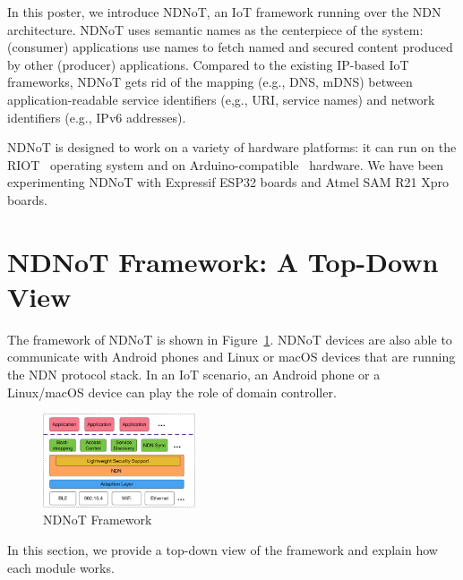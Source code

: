 \documentclass[sigconf]{acmart}
\begin{document}
In this poster, we introduce NDNoT, an IoT framework running over the NDN architecture.
NDNoT uses semantic names as the centerpiece of the system: (consumer) applications use names to fetch named and secured content produced by other (producer) applications.
Compared to the existing IP-based IoT frameworks, NDNoT gets rid of the mapping (e.g., DNS, mDNS) between application-readable service identifiers (e,g., URI, service names) and network identifiers (e.g., IPv6 addresses).

NDNoT is designed to work on a variety of hardware platforms: it can run on the RIOT~\cite{baccelli2018riot} operating system and on Arduino-compatible~\cite{Arduino} hardware.
We have been experimenting NDNoT with Expressif ESP32 boards and Atmel SAM R21 Xpro boards.

\section{NDNoT Framework: A Top-Down View}

The framework of NDNoT is shown in Figure~\ref{fig:framework}.
NDNoT devices are also able to communicate with Android phones and Linux or macOS devices that are running the NDN protocol stack.
In an IoT scenario, an Android phone or a Linux/macOS device can play the role of domain controller.

\begin{figure}[h]
	\vspace{-0.1cm}
	\centering
	\includegraphics[width=0.4\textwidth]{figures/iot-framework}
	\caption{NDNoT Framework}
	\vspace{-0.2cm}
	\label{fig:framework}
\end{figure}

In this section, we provide a top-down view of the framework and explain how each module works.
\end{document}
